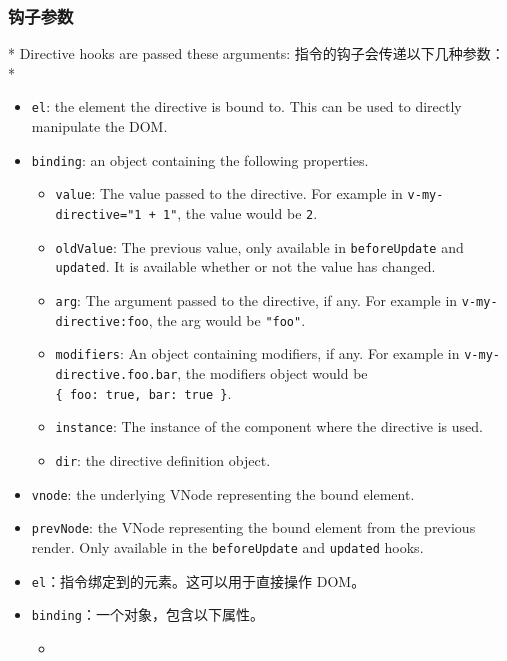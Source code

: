\begin{paracol}{2}
\subsubsection{钩子参数}
\switchcolumn[0]*%
Directive hooks are passed these arguments:
\switchcolumn
指令的钩子会传递以下几种参数：
\switchcolumn[0]*%
\begin{itemize}
\item
  \texttt{el}: the element the directive is bound to. This can be used
  to directly manipulate the DOM.
\item
  \texttt{binding}: an object containing the following properties.
  \begin{itemize}
    \item
      \texttt{value}: The value passed to the directive. For example in
      \texttt{v-my-directive="1\ +\ 1"}, the value would be \texttt{2}.
    \item
      \texttt{oldValue}: The previous value, only available in
      \texttt{beforeUpdate} and \texttt{updated}. It is available whether
      or not the value has changed.
    \item
      \texttt{arg}: The argument passed to the directive, if any. For
      example in \texttt{v-my-directive:foo}, the arg would be
      \texttt{"foo"}.
    \item
      \texttt{modifiers}: An object containing modifiers, if any. For
      example in \texttt{v-my-directive.foo.bar}, the modifiers object
      would be \texttt{\{\ foo:\ true,\ bar:\ true\ \}}.
    \item
      \texttt{instance}: The instance of the component where the directive
      is used.
    \item
      \texttt{dir}: the directive definition object.
    \end{itemize}
  \item
    \texttt{vnode}: the underlying VNode representing the bound element.
  \item
    \texttt{prevNode}: the VNode representing the bound element from the
    previous render. Only available in the \texttt{beforeUpdate} and
    \texttt{updated} hooks.
  \end{itemize}
\switchcolumn
\begin{itemize}
\item
  \texttt{el}：指令绑定到的元素。这可以用于直接操作 DOM。
\item
  \texttt{binding}：一个对象，包含以下属性。
  \begin{itemize}
    \item

\end{itemize}
\end{itemize}
\end{paracol}
